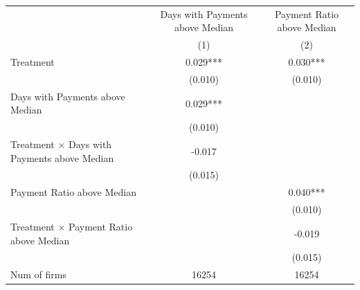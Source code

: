 \begin{tabular}[t]{lcc}
\toprule
  & Days with Payments above Median & Payment Ratio above Median \\
  & (1)  & (2)  \\
\midrule
Treatment & 0.029*** & 0.030***\\
 & (0.010) & (0.010)\\
Days with Payments above Median & 0.029*** & \\
 & (0.010) & \\
Treatment × Days with Payments above Median & -0.017 & \\
 & (0.015) & \\
Payment Ratio above Median &  & 0.040***\\
 &  & (0.010)\\
Treatment × Payment Ratio above Median &  & -0.019\\
 &  & (0.015)\\
\midrule
Num of firms & 16254 & 16254\\
\bottomrule
\end{tabular}
